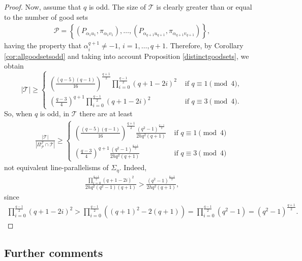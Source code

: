 \documentclass[11pt]{article}
\theoremstyle{definition}
\numberwithin{equation}{section}
\def\cJ{\mathcal J}
\def\cP{\mathcal P}
\def\cT{\mathcal T}
\begin{document}
\begin{proof}
Now, assume that $q$ is odd. The size of $\cT$ is clearly greater than or equal to the number of good sets
\begin{align*}
\cP = \left\{\left(P_{\alpha_{1} u_1}, \pi_{\alpha_{1} v_1}\right), \dots, \left(P_{\alpha_{q+1} u_{q+1}}, \pi_{\alpha_{q+1} v_{q+1}}\right)\right\},
\end{align*}
having the property that $\alpha_i^{q+1} \neq -1$, $i = 1, \dots, q+1$. Therefore, by Corollary \ref{cor:allgoodsetsodd} and taking into account Proposition \ref{distinctgoodsets}, we obtain
\[
|\cT| \geq 
    \begin{cases} 
    \left(\frac{(q-5)(q-1)}{16}\right)^{\frac{q+1}{2}} \prod\limits_{i=0}^{\frac{q-1}{2}} \left(q+1-2i \right)^2 & \mbox{ if }q \equiv 1 \pmod{4}, \\ 
    \left(\frac{q-3}{4}\right)^{q+1} \prod\limits_{i=0}^{\frac{q-1}{2}} \left(q+1-2i \right)^2 & \mbox{ if } q \equiv 3 \pmod{4}. 
    \end{cases}
\]
So, when $q$ is odd, in $\cT$ there are at least 
\begin{align*}
    \frac{|\cT|}{|\Pi_{\cP}^{\cJ} \cap \cT|} \ge 
   \begin{cases} 
   \left(\frac{(q-5)(q-1)}{16}\right)^{\frac{q+1}{2}} \frac{(q^2-1)^{\frac{q-1}{2}}}{2hq^2(q+1)} & \mbox{ if }q \equiv 1 \pmod{4} \\ 
   \left(\frac{q-3}{4}\right)^{q+1} \frac{(q^2-1)^{\frac{q-1}{2}}}{2hq^2(q+1)} & \mbox{ if } q \equiv 3 \pmod{4}
   \end{cases}
\end{align*}
not equivalent line-parallelisms of $\Sigma_{\eta}$. Indeed,
\begin{align*}
    \frac{\prod_{i = 0}^{\frac{q-1}{2}} \left(q+1 - 2 i \right)^2}{2hq^2(q^2-1)(q+1)} > \frac{(q^2-1)^{\frac{q-1}{2}}}{2hq^2(q+1)},
\end{align*}
since
\begin{align*}
    \prod_{i = 0}^{\frac{q-1}{2}} \left(q+1 - 2i \right)^2 > \prod_{i = 0}^{\frac{q-1}{2}} \left((q+1)^2 - 2 (q+1) \right) = \prod_{i = 0}^{\frac{q-1}{2}} \left(q^2-1 \right) = \left(q^2-1\right)^\frac{q+1}{2}.
\end{align*}
\end{proof}



\subsection{Further comments}
\end{document}
